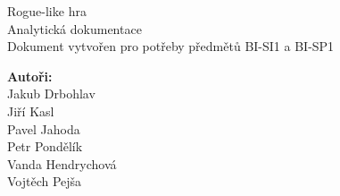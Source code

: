 \documentclass[12pt,a4paper]{article}
\begin{document}



\renewcommand{\headrulewidth}{0pt}
\renewcommand{\footrulewidth}{0pt}

\begin{titlepage}
  \thispagestyle{fancy}

	\vspace*{\fill}
	\begin{center}
    {\fontsize{28.83}{100}\selectfont Rogue-like hra}\\[0.6cm]
		{\fontsize{15.74}{40}\selectfont Analytická dokumentace}\\[1.5cm]
    {\fontsize{10}{10} \selectfont Dokument vytvořen pro potřeby předmětů
    BI-SI1 a BI-SP1}\\
	\end{center}

	\vspace*{\fill}

  {\fontsize{10}{10} \selectfont \noindent
\textbf{Autoři:}\\
  Jakub Drbohlav\\
  Jiří Kasl\\
  Pavel Jahoda\\
  Petr Pondělík\\
  Vanda Hendrychová\\
  Vojtěch Pejša\\
  }
\end{titlepage}

\newpage

\renewcommand{\headrulewidth}{0.4pt}
\renewcommand{\footrulewidth}{0.4pt}






\tableofcontents

\newpage

\listoffigures

\newpage

\end{document}
